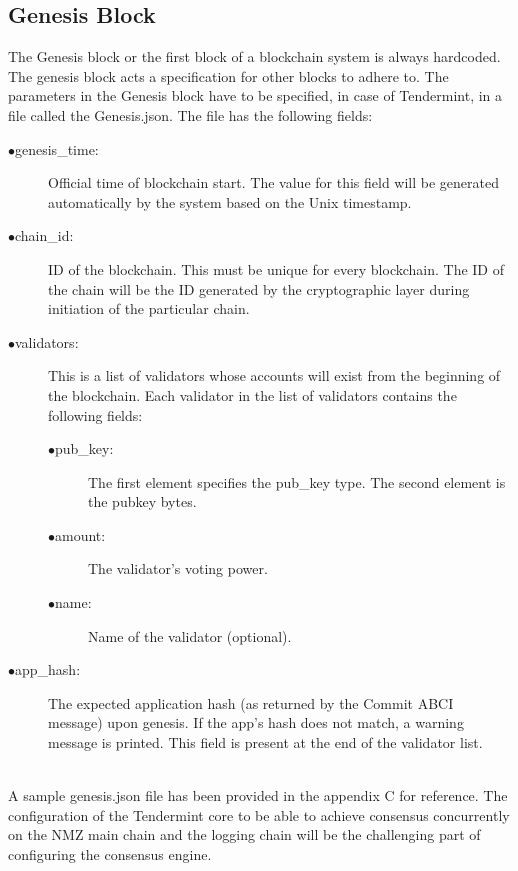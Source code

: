 \documentclass[a4paper,twoside,phd]{BYUPhys}
\begin{document}
\subsection{Genesis Block}
The Genesis block or the first block of a blockchain system is always hardcoded. The genesis block acts a specification for other blocks to adhere to. The parameters in the Genesis block have to be specified, in case of Tendermint, in a file called the Genesis.json. The file has the following fields:
\begin{description}
\item[$\bullet$genesis\_time:]Official time of blockchain start. The value for this field will be generated automatically by the system based on the Unix timestamp.
\item[$\bullet$chain\_id:] ID of the blockchain. This must be unique for every blockchain. The ID of the chain will be the ID generated by the cryptographic layer during initiation of the particular chain.
\item[$\bullet$validators:] This is a list of validators whose accounts will exist from the beginning of the blockchain. Each validator in the list of validators contains the following fields:
\begin{description}
\item[$\bullet$pub\_key:]The first element specifies the pub\_key type. The second element is the pubkey bytes.
\item[$\bullet$amount:]The validator’s voting power.
\item[$\bullet$name:]Name of the validator (optional).
\end{description}

\item[$\bullet$app\_hash:]The expected application hash (as returned by the Commit ABCI message) upon genesis. If the app’s hash does not match, a warning message is printed. This field is present at the end of the validator list.
\\
\\
\end{description}
A sample genesis.json file has been provided in the appendix C for reference. The configuration of the Tendermint core to be able to achieve consensus concurrently on the NMZ main chain and the logging chain will be the challenging part of configuring the consensus engine.
\end{document}
